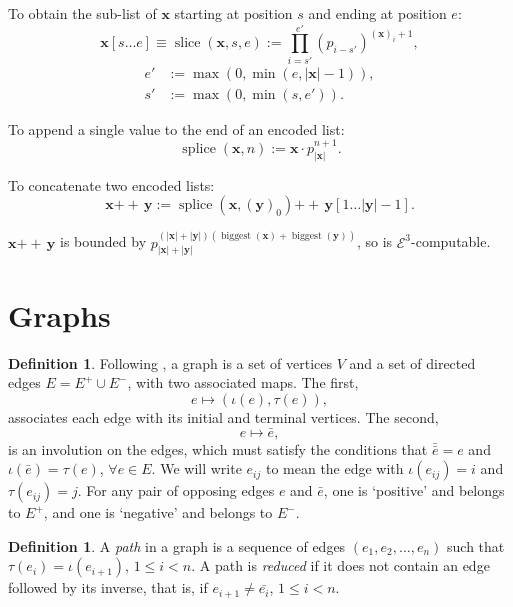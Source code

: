 \documentclass[a4paper]{article}
\newcommand{\grz}[1]{$\mathcal{E}^{#1}$}	%
\newcommand{\xvec}{\mathbf{x}}	%
\newcommand{\yvec}{\mathbf{y}}	%
\newcommand{\concat}{\ensuremath{+\!\!\!\!+\,}}	%
\theoremstyle{plain}
\theoremstyle{definition}
\newtheorem{definition}[theorem]{Definition}
\begin{document}
To obtain the sub-list of $\xvec$ starting at position $s$ and ending at position $e$:
\begin{equation} \xvec[s \dots e] \equiv \operatorname{slice}(\xvec,s,e) := \prod_{i=s'}^{e'}(p_{i-s'})^{(\xvec)_i+1}, \end{equation}
\begin{equation*} 
\begin{split}
	e' &:= \max(0,\min(e,|\xvec|-1)), \\ 
	s' &:= \max(0,\min(s,e')). 
\end{split}
\end{equation*}

To append a single value to the end of an encoded list:
\begin{equation} \operatorname{splice}(\xvec,n) := \xvec \cdot p_{|\xvec|}^{n+1}. \end{equation}

To concatenate two encoded lists:
\begin{equation} \xvec \concat \yvec := \operatorname{splice}(\xvec,(\yvec)_0) \concat \yvec[1 \dots |\yvec|-1]. \end{equation}

$\xvec \concat \yvec$ is bounded by $p_{|\xvec|+|\yvec|}^{(|\xvec|+|\yvec|) (\operatorname{biggest}(\xvec)+\operatorname{biggest}(\yvec))}$, so is \grz{3}-computable.

\section{Graphs \label{graphs}}

\begin{definition}
	Following \cite{Serre_1977}, a graph is a set of vertices $V$ and a set of directed edges $E = E^+ \cup E^-$, with two associated maps. The first,
\[ e \mapsto (\iota(e), \tau(e)), \]
associates each edge with its initial and terminal vertices. The second,
\[ e \mapsto \bar{e}, \]
is an involution on the edges, which must satisfy the conditions that $\bar{\bar{e}} = e$ and $\iota(\bar{e}) = \tau(e)$, $\forall e \in E$. We will write $e_{ij}$ to mean the edge with $\iota(e_{ij}) = i$ and $\tau(e_{ij})=j$. For any pair of opposing edges $e$ and $\bar{e}$, one is `positive' and belongs to $E^+$, and one is `negative' and belongs to $E^-$.
\end{definition}

\begin{definition}
A {\it path} in a graph is a sequence of edges $(e_1, e_2, \dots, e_n)$ such that $\tau(e_i) = \iota(e_{i+1})$, $1 \leq i < n$. A path is {\it reduced} if it does not contain an edge followed by its inverse, that is, if $e_{i+1} \neq \bar{e_i}$, $1 \leq i < n$. 
\end{definition}
\end{document}
